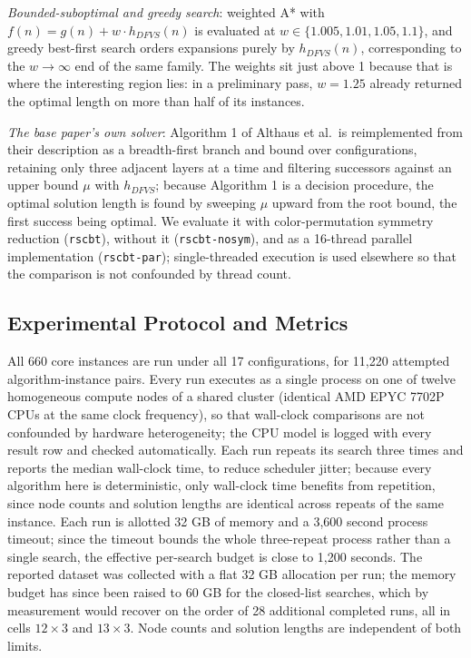 \documentclass[letterpaper]{article}
\begin{document}
\emph{Bounded-suboptimal and greedy search}: weighted A* with
$f(n) = g(n) + w \cdot h_{DFVS}(n)$ is evaluated at
$w \in \{1.005, 1.01, 1.05, 1.1\}$, and greedy best-first search orders
expansions purely by $h_{DFVS}(n)$, corresponding to the $w \to \infty$ end
of the same family. The weights sit just above 1 because that is where the
interesting region lies: in a preliminary pass, $w = 1.25$ already returned
the optimal length on more than half of its instances.

\emph{The base paper's own solver}: Algorithm 1 of Althaus et al.\ is
reimplemented from their description as a breadth-first branch and bound
over configurations, retaining only three adjacent layers at a time and
filtering successors against an upper bound $\mu$ with $h_{DFVS}$; because
Algorithm 1 is a decision procedure, the optimal solution length is found
by sweeping $\mu$ upward from the root bound, the first success being
optimal. We evaluate it with color-permutation symmetry reduction
(\texttt{rscbt}), without it (\texttt{rscbt-nosym}), and as a 16-thread
parallel implementation (\texttt{rscbt-par}); single-threaded execution is
used elsewhere so that the comparison is not confounded by thread count.

\subsection{Experimental Protocol and Metrics}

All 660 core instances are run under all 17 configurations, for 11,220
attempted algorithm-instance pairs. Every run executes as a single process
on one of twelve homogeneous compute nodes of a shared cluster (identical
AMD EPYC 7702P CPUs at the same clock frequency), so that wall-clock
comparisons are not confounded by hardware heterogeneity; the CPU model is
logged with every result row and checked automatically. Each run repeats
its search three times and reports the median wall-clock time, to reduce
scheduler jitter; because every algorithm here is deterministic, only
wall-clock time benefits from repetition, since node counts and solution
lengths are identical across repeats of the same instance. Each run is
allotted 32 GB of memory and a 3,600 second process timeout; since the
timeout bounds the whole three-repeat process rather than a single search,
the effective per-search budget is close to 1,200 seconds.
The reported dataset was collected with a flat 32 GB allocation per run;
the memory budget has since been raised to 60 GB for the closed-list
searches, which by measurement would recover on the order of 28 additional
completed runs, all in cells $12 \times 3$ and $13 \times 3$. Node counts
and solution lengths are independent of both limits.
\end{document}
